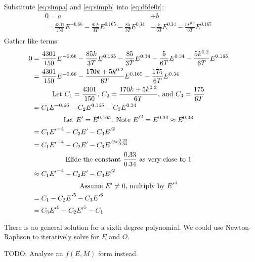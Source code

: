 \documentclass{article}
\begin{document}
Substitute \eqref{eq:simpa} and \eqref{eq:simpb} into \eqref{eq:dfde0r}:
\begin{equation}\label{eq:dfde0r2}
  \begin{split}
    0 = a & + b \\
    = \frac{4301}{150}E^{-0.66} - \frac{85k}{3T}E^{0.165} - \frac{85}{3T}E^{0.34} & - \frac{5}{6T}E^{0.34} - \frac{5k^{0.2}}{6T}E^{0.165} \\
  \end{split}
\end{equation}
Gather like terms:
\begin{equation}\label{eq:dfde0r3}
  \begin{split}
  0 & = \frac{4301}{150}E^{-0.66} - \frac{85k}{3T}E^{0.165} - \frac{85}{3T}E^{0.34} - \frac{5}{6T}E^{0.34} - \frac{5k^{0.2}}{6T}E^{0.165} \\
    & = \frac{4301}{150}E^{-0.66} - \frac{170k + 5k^{0.2}}{6T}E^{0.165} - \frac{175}{6T}E^{0.34} \\
    \span \text{Let $C_1 = \frac{4301}{150}$, $C_2 = \frac{170k + 5k^{0.2}}{6T}$, and $C_3 = \frac{175}{6T}$} \\
    & = C_1E^{-0.66} - C_2E^{0.165} - C_3E^{0.34} \\
    \span \text{Let $E^\prime = E^{0.165}$. Note ${E^\prime}^2 = E^{0.34} \approx E^{0.33}$} \\
    & = C_1{E^\prime}^{-4} - C_2E^\prime - C_3{E^\prime}^2 \\
    & = C_1{E^\prime}^{-4} - C_2E^\prime - C_3{E^\prime}^{2*\frac{0.33}{0.34}} \\
    \span \text{Elide the constant $\frac{0.33}{0.34}$ as very close to $1$} \\
    & \approx C_1{E^\prime}^{-4} - C_2E^\prime - C_3{E^\prime}^2 \\
    \span \text{Assume $E^\prime \ne 0$, multiply by ${E^\prime}^4$} \\
    & = C_1 - C_2{E^\prime}^5 - C_3{E^\prime}^6 \\
    & = C_3{E^\prime}^6 + C_2{E^\prime}^5 - C_1 \\
  \end{split}
\end{equation}

There is no general solution for a sixth degree polynomial. We could use Newton-Raphson to iteratively solve for $E$ and $O$.

\hrulefill

TODO: Analyze an $f(E, M)$ form instead.
\end{document}
